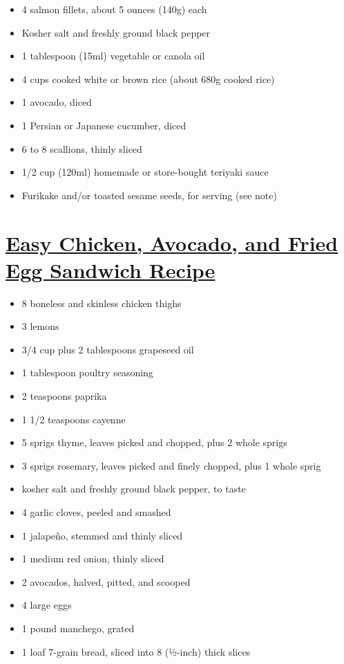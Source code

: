 \documentclass[]{article}
\providecommand{\tightlist}{%
  \setlength{\itemsep}{0pt}\setlength{\parskip}{0pt}}
\begin{document}
\begin{itemize}
\tightlist
\item
  4 salmon fillets, about 5 ounces (140g) each
\item
  Kosher salt and freshly ground black pepper
\item
  1 tablespoon (15ml) vegetable or canola oil
\item
  4 cups cooked white or brown rice (about 680g cooked rice)
\item
  1 avocado, diced
\item
  1 Persian or Japanese cucumber, diced
\item
  6 to 8 scallions, thinly sliced
\item
  1/2 cup (120ml) homemade or store-bought teriyaki sauce
\item
  Furikake and/or toasted sesame seeds, for serving (see note)
\end{itemize}

\hypertarget{easy-chicken-avocado-and-fried-egg-sandwich-recipe}{%
\section{\texorpdfstring{\href{https://www.vice.com/en_us/article/gyam9j/easy-chicken-avocado-and-fried-egg-sandwich-recipe}{Easy Chicken, Avocado, and Fried Egg Sandwich Recipe}}{Easy Chicken, Avocado, and Fried Egg Sandwich Recipe}}\label{easy-chicken-avocado-and-fried-egg-sandwich-recipe}}

\begin{itemize}
\tightlist
\item
  8 boneless and skinless chicken thighs
\item
  3 lemons
\item
  3/4 cup plus 2 tablespoons grapeseed oil
\item
  1 tablespoon poultry seasoning
\item
  2 teaspoons paprika
\item
  1 1/2 teaspoons cayenne
\item
  5 sprigs thyme, leaves picked and chopped, plus 2 whole sprigs
\item
  3 sprigs rosemary, leaves picked and finely chopped, plus 1 whole sprig
\item
  kosher salt and freshly ground black pepper, to taste
\item
  4 garlic cloves, peeled and smashed
\item
  1 jalapeño, stemmed and thinly sliced
\item
  1 medium red onion, thinly sliced
\item
  2 avocados, halved, pitted, and scooped
\item
  4 large eggs
\item
  1 pound manchego, grated
\item
  1 loaf 7-grain bread, sliced into 8 (½-inch) thick slices
\end{itemize}
\end{document}
